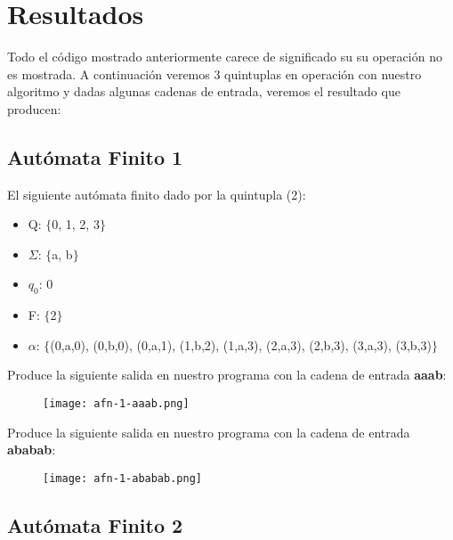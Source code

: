\section{Resultados}

Todo el código mostrado anteriormente carece de significado su su operación no es mostrada. A continuación veremos 3 quintuplas en operación con nuestro algoritmo y dadas algunas cadenas de entrada, veremos el resultado que producen:

\subsection{Autómata Finito 1}

El siguiente autómata finito dado por la quintupla (2):

\begin{itemize}
\item Q: $\{$0, 1, 2, 3$\}$
\item $\Sigma$: $\{$a, b$\}$
\item $q_{0}$: 0
\item F: $\{$2$\}$
\item $\alpha$: $\{$(0,a,0), (0,b,0), (0,a,1), (1,b,2), (1,a,3), (2,a,3), (2,b,3), (3,a,3), (3,b,3)$\}$
\end{itemize}

Produce la siguiente salida en nuestro programa con la cadena de entrada \textbf{aaab}:

\begin{figure}[H]
\texttt{[image: afn-1-aaab.png]}
\centering \linebreak {}
\end{figure} 

Produce la siguiente salida en nuestro programa con la cadena de entrada \textbf{ababab}:

\begin{figure}[H]
\texttt{[image: afn-1-ababab.png]}
\centering \linebreak {}
\end{figure} 

\subsection{Autómata Finito 2}

